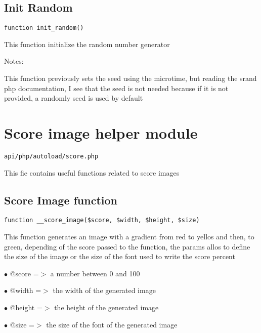 \documentclass[a4paper]{book}
\begin{document}
\hypertarget{toc231}{}
\subsection{Init Random}

\begin{lstlisting}
function init_random()
\end{lstlisting}

This function initialize the random number generator

Notes:

This function previously sets the seed using the microtime, but reading
the srand php documentation, I see that the seed is not needed because
if it is not provided, a randomly seed is used by default

\hypertarget{toc232}{}
\section{Score image helper module}

\begin{lstlisting}
api/php/autoload/score.php
\end{lstlisting}

This fie contains useful functions related to score images

\hypertarget{toc233}{}
\subsection{Score Image function}

\begin{lstlisting}
function __score_image($score, $width, $height, $size)
\end{lstlisting}

This function generates an image with a gradient from red to yellos and
then, to green, depending of the score passed to the function, the params
allos to define the size of the image or the size of the font used to
write the score percent

\begin{compactitem}
\item[\color{myblue}$\bullet$] @score  =$>$ a number between 0 and 100
\item[\color{myblue}$\bullet$] @width  =$>$ the width of the generated image
\item[\color{myblue}$\bullet$] @height =$>$ the height of the generated image
\item[\color{myblue}$\bullet$] @size   =$>$ the size of the font of the generated image
\end{compactitem}
\end{document}
